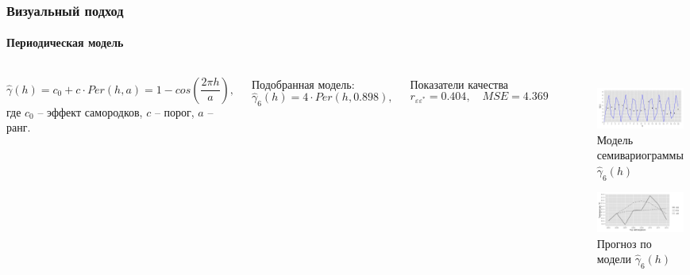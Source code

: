\documentclass[10pt,pdf,aspectratio=169,hyperref={unicode}]{beamer}
\begin{document}
\begin{frame}
  \frametitle{Визуальный подход}
  \framesubtitle{Периодическая модель}
  \begin{columns}[c]
  \column{3in}
  \begin{equation}
  \label{eq:per}
    \widehat{\gamma}(h) = c_0 + c \cdot Per(h, a) = 1 - cos(\frac{2 \pi h}{a}),
  \end{equation}
  где $ c_0 $ -- эффект самородков, $ c $ -- порог, $ a $ -- ранг.

  \vspace{0.5em}

  Подобранная модель:
  \begin{equation}
  \label{eq:gamma6}
    \widehat{\gamma}_6(h) = 4 \cdot Per(h, 0.898),
  \end{equation}

  Показатели качества
  \begin{equation*}
    r_{\varepsilon\varepsilon^{*}} = 0.404, \quad MSE = 4.369
  \end{equation*}

  \column{3in}
  \vspace{-14.5pt}
  \begin{figure}[H]
    \includegraphics[width=0.9\linewidth]{../../figures/variogram/per-fit-cv-modeled.png} \\
    \caption{Модель семивариограммы $\widehat{\gamma}_6(h)$}
    \includegraphics[width=0.9\linewidth]{../../figures/variogram/per-fit-cv-cross-prediction.png}
    \caption{Прогноз по модели $\widehat{\gamma}_6(h)$}
  \end{figure}
  \end{columns}
\end{frame}
\end{document}
